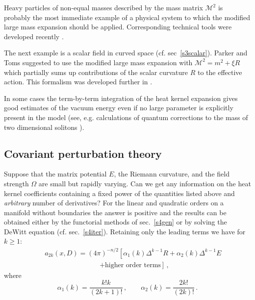 Heavy particles of non-equal masses described by the mass matrix
$\mathcal{M}^2$ is probably the most immediate example of a physical
system to which the modified large mass expansion should be applied.
Corresponding technical tools were developed recently 
\cite{Osipov:2000rg,Osipov:2001bj,Osipov:2001nx}.

The next example is a scalar field in curved space (cf. sec\ 
\ref{s3scalar}). Parker and Toms suggested 
\cite{Parker:1985dj,Parker:1985mv} to use the modified large
mass expansion with $\mathcal{M}^2=m^2+\xi R$ which partially
sums up contributions of the scalar curvature $R$ to the effective
action. This formalism was developed further in 
\cite{Jack:1985mw,Sushkov:2002rf}.

In some cases the term-by-term integration of the heat kernel
expansion gives good estimates of the vacuum energy even if no
large parameter is explicitly present in the model (see, e.g.
calculations of quantum corrections to the mass of two dimensional
solitons \cite{Dunne:1999du,AlonsoIzquierdo:2002eb}). 
\subsection{Covariant perturbation theory}\label{s8covpt}
Suppose that the matrix potential $E$, the Riemann curvature,
and the field strength $\Omega$ are small but rapidly varying.
Can we get any information on the heat kernel coefficients
containing a fixed power of the quantities listed above and
{\it arbitrary} number of derivatives? For the linear and
quadratic orders on a manifold without boundaries the answer
is positive and the results can be obtained either by the
functorial methods of sec.\ \ref{s4gen} 
\cite{Gilkey:1988,Branson:1990b}
or by solving the DeWitt equation 
\cite{Avramidi:1989er,Avramidi:1990ug,Avramidi:1991je}
(cf. sec.\ \ref{s4iter}). Retaining only the leading terms
we have for $k\ge 1$:
\begin{eqnarray}
&&a_{2k}(x,D) =(4\pi )^{-n/2} \left[ \alpha_1(k) 
\Delta^{k-1} R +\alpha_2 (k) \Delta^{k-1} E \right.\label{leadhk}\\
&&\qquad\qquad\qquad\qquad \left. 
+\mbox{higher order terms} \right]\,, \nonumber
\end{eqnarray}
where \cite{Gilkey:1979,Gilkey:1988}
\begin{equation}
\alpha_1(k)=\frac{k!k}{(2k+1)!} \,,\qquad
\alpha_2(k)=\frac{2k!}{(2k)!}\,.\label{al12k}
\end{equation}


